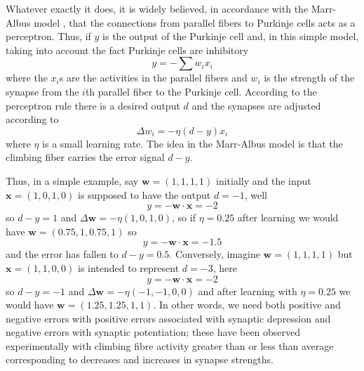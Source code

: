 \documentclass[11pt,a4paper]{scrartcl}
\begin{document}
Whatever exactly it does, it is widely believed, in accordance with
the Marr-Albus model \cite{Marr1969a,Albus1971a}, that the connections
from parallel fibers to Purkinje cells acts as a perceptron. Thus, if
$y$ is the output of the Purkinje cell and, in this simple model,
taking into account the fact Purkinje cells are inhibitory
\begin{equation}
y=-\sum{w_ix_i}
\end{equation}
where the $x_i$s are the activities in the parallel fibers and $w_i$
is the strength of the synapse from the $i$th parallel fiber to the
Purkinje cell. According to the perceptron rule there is a desired output $d$ and the synapses are adjusted according to
\begin{equation}
\Delta w_i=-\eta (d-y)x_i
\end{equation}
where $\eta$ is a small learning rate. The idea in the Marr-Albus
model is that the climbing fiber carries the error signal $d-y$.

Thus, in a simple example, say $\mathbf{w}=(1,1,1,1)$ initially and
the input $\mathbf{x}=(1,0,1,0)$ is supposed to have the output
$d=-1$, well
\begin{equation}
y=-\mathbf{w}\cdot\mathbf{x}=-2
\end{equation}
so $d-y=1$ and $\Delta\mathbf{w}=-\eta(1,0,1,0)$, so if $\eta=0.25$ after learning we would have $\mathbf{w}=(0.75,1,0.75,1)$ so
\begin{equation}
y=-\mathbf{w}\cdot\mathbf{x}=-1.5
\end{equation}
and the error has fallen to $d-y=0.5$. Conversely, imagine
$\mathbf{w}=(1,1,1,1)$ but $\mathbf{x}=(1,1,0,0)$ is intended to
represent $d=-3$, here
\begin{equation}
y=-\mathbf{w}\cdot\mathbf{x}=-2
\end{equation}
so $d-y=-1$ and $\Delta\mathbf{w}=-\eta(-1,-1,0,0)$ and after learning
with $\eta=0.25$ we would have $\mathbf{w}=(1.25,1.25,1,1)$. In other
words, we need both positive and negative errors with positive errors
associated with synaptic depression and negative errors with synaptic
potentiation; these have been observed experimentally
\cite{ItoEtAl1982a,DeanEtAl2010a} with climbing fibre activity greater
than or less than average corresponding to decreases and increases in
synapse strengths.
\end{document}
